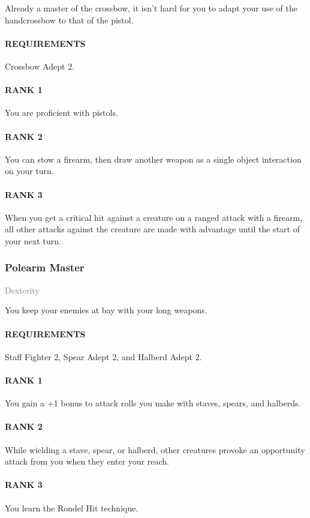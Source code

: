 \normalsize
Already a master of the crossbow, it isn't hard for you to adapt your use of the handcrossbow to that of the pistol.
\paragraph{REQUIREMENTS} Crossbow Adept 2.
\paragraph{RANK 1} You are proficient with pistols.
\paragraph{RANK 2} You can stow a firearm, then draw another weapon as a single object interaction on your turn.
\paragraph{RANK 3} When you get a critical hit against a creature on a ranged attack with a firearm, all other attacks against the creature are made with advantage until the start of your next turn.

\subsubsection{Polearm Master} \label{feat::polerarmmaster} %
\small{\textcolor{gray}{Dexterity}}

\normalsize
You keep your enemies at bay with your long weapons.
\paragraph{REQUIREMENTS} Staff Fighter 2, Spear Adept 2, and Halberd Adept 2.
\paragraph{RANK 1} You gain a +1 bonus to attack rolls you make with staves, spears, and halberds.
\paragraph{RANK 2} While wielding a stave, spear, or halberd, other creatures provoke an opportunity attack from you when they enter your reach.
\paragraph{RANK 3} You learn the Rondel Hit technique.


